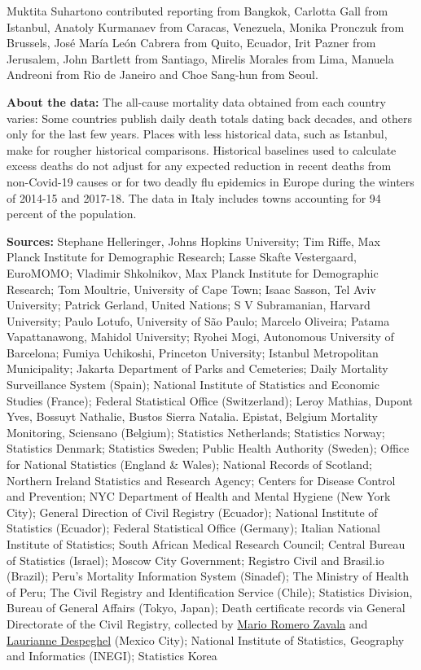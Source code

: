 Muktita Suhartono contributed reporting from Bangkok, Carlotta Gall from
Istanbul, Anatoly Kurmanaev from Caracas, Venezuela, Monika Pronczuk
from Brussels, José María León Cabrera from Quito, Ecuador, Irit Pazner
from Jerusalem, John Bartlett from Santiago, Mirelis Morales from Lima,
Manuela Andreoni from Rio de Janeiro and Choe Sang-hun from Seoul.

\textbf{About the data:} The all-cause mortality data obtained from each
country varies: Some countries publish daily death totals dating back
decades, and others only for the last few years. Places with less
historical data, such as Istanbul, make for rougher historical
comparisons. Historical baselines used to calculate excess deaths do not
adjust for any expected reduction in recent deaths from non-Covid-19
causes or for two deadly flu epidemics in Europe during the winters of
2014-15 and 2017-18. The data in Italy includes towns accounting for 94
percent of the population.

\textbf{Sources:} Stephane Helleringer, Johns Hopkins University; Tim
Riffe, Max Planck Institute for Demographic Research; Lasse Skafte
Vestergaard, EuroMOMO; Vladimir Shkolnikov, Max Planck Institute for
Demographic Research; Tom Moultrie, University of Cape Town; Isaac
Sasson, Tel Aviv University; Patrick Gerland, United Nations; S V
Subramanian, Harvard University; Paulo Lotufo, University of São Paulo;
Marcelo Oliveira; Patama Vapattanawong, Mahidol University; Ryohei Mogi,
Autonomous University of Barcelona; Fumiya Uchikoshi, Princeton
University; Istanbul Metropolitan Municipality; Jakarta Department of
Parks and Cemeteries; Daily Mortality Surveillance System (Spain);
National Institute of Statistics and Economic Studies (France); Federal
Statistical Office (Switzerland); Leroy Mathias, Dupont Yves, Bossuyt
Nathalie, Bustos Sierra Natalia. Epistat, Belgium Mortality Monitoring,
Sciensano (Belgium); Statistics Netherlands; Statistics Norway;
Statistics Denmark; Statistics Sweden; Public Health Authority (Sweden);
Office for National Statistics (England \& Wales); National Records of
Scotland; Northern Ireland Statistics and Research Agency; Centers for
Disease Control and Prevention; NYC Department of Health and Mental
Hygiene (New York City); General Direction of Civil Registry (Ecuador);
National Institute of Statistics (Ecuador); Federal Statistical Office
(Germany); Italian National Institute of Statistics; South African
Medical Research Council; Central Bureau of Statistics (Israel); Moscow
City Government; Registro Civil and Brasil.io (Brazil); Peru's Mortality
Information System (Sinadef); The Ministry of Health of Peru; The Civil
Registry and Identification Service (Chile); Statistics Division, Bureau
of General Affairs (Tokyo, Japan); Death certificate records via General
Directorate of the Civil Registry, collected by
\href{https://datos.nexos.com.mx/?p=1458}{Mario Romero Zavala} and
\href{https://github.com/mariorz/folio-deceso}{Laurianne Despeghel}
(Mexico City); National Institute of Statistics, Geography and
Informatics (INEGI); Statistics Korea

